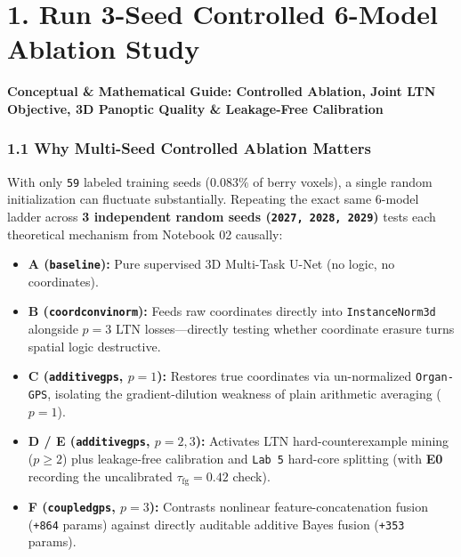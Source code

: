 \documentclass[10pt,a4paper]{article}
\renewcommand{\_}{\origunderscore\allowbreak}
\begin{document}
\section*{1. Run 3-Seed Controlled 6-Model Ablation Study}

\begin{guidehdr}
{\small\bfseries\color{kiwigreen!75!black}Conceptual \& Mathematical Guide: Controlled Ablation, Joint LTN Objective, 3D Panoptic Quality \& Leakage-Free Calibration}
\end{guidehdr}

\subsubsection*{1.1 Why Multi-Seed Controlled Ablation Matters}
With only \texttt{59} labeled training seeds ($0.083\%$ of berry voxels), a single random initialization can fluctuate substantially. Repeating the exact same 6-model ladder across \textbf{3 independent random seeds (\texttt{2027, 2028, 2029})} tests each theoretical mechanism from Notebook 02 causally:
\begin{itemize}
\item \textbf{A (\texttt{baseline}):} Pure supervised 3D Multi-Task U-Net (no logic, no coordinates).
\item \textbf{B (\texttt{coordconv\_inorm}):} Feeds raw coordinates directly into \texttt{InstanceNorm3d} alongside $p = 3$ LTN losses---directly testing whether coordinate erasure turns spatial logic destructive.
\item \textbf{C (\texttt{additive\_gps}, $p = 1$):} Restores true coordinates via un-normalized \texttt{Organ-GPS}, isolating the gradient-dilution weakness of plain arithmetic averaging ($p = 1$).
\item \textbf{D /\allowbreak{} E (\texttt{additive\_gps}, $p = 2, 3$):} Activates LTN hard-counterexample mining ($p \ge 2$) plus leakage-free calibration and \texttt{Lab 5} hard-core splitting (with \textbf{E0} recording the uncalibrated $\tau_{\text{fg}} = 0.42$ check).
\item \textbf{F (\texttt{coupled\_gps}, $p = 3$):} Contrasts nonlinear feature-concatenation fusion (\texttt{+864} params) against directly auditable additive Bayes fusion (\texttt{+353} params).
\end{itemize}
\end{document}
